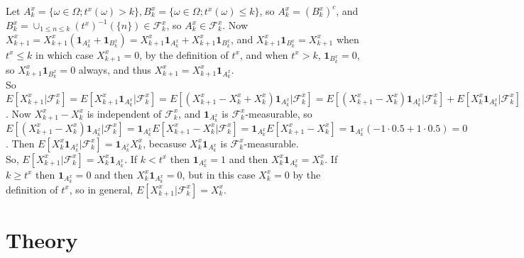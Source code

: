 \documentclass[12pt]{article}
\newcommand{\fall}[0] { \textrm{ for all } }
\newcommand{\nats}[0] { \mathbb{N}}
\newcommand{\F}[0] { \mathcal{F} }
\newcommand{\om}[0] { \omega }
\newcommand{\Om}[0] { \Omega }
\newcommand{ \cf }[1] { \mathbf{1}_{#1} }
\begin{document}
\noindent
Let $A^x_k = \{ \om \in \Om; t^x(\om) > k \} , B^x_k = \{ \om \in \Om; t^x(\om) \le k \} $, so $A^x_k = (B^x_k)^c$, and $B^x_k = \cup_{1 \le n \le k} (t^x)^{-1}(\{ n\}) \in \F^x_k$, so $A^x_k \in \F^x_k$. Now $X^x_{k+1} = X^x_{k+1} ( \cf{A^x_k} + \cf{B^x_k} ) = X^x_{k+1}  \cf{A^x_k} + X^x_{k+1} \cf{B^x_k} $, and $ X^x_{k+1} \cf{B^x_k} = X^x_{k+1} $ when $t^x \le k$ in which case $X^x_{k+1} = 0$, by the definition of $t^x$, and when $t^x > k$,  $ \cf{B^x_k} = 0$, so  $ X^x_{k+1} \cf{B^x_k} = 0 $ always, and thus $X^x_{k+1} = X^x_{k+1} \cf{A^x_k}$. \\

\noindent
So $E[ X^x_{k+1} | \F^x_k ] = E[ X^x_{k+1}\cf{A^x_k}  | \F^x_k ] = E[ ( X^x_{k+1} - X^x_{k}  + X^x_{k}   ) \cf{A^x_k}  | \F^x_k ] = E[ ( X^x_{k+1} - X^x_{k} ) \cf{A^x_k}  | \F^x_k ]  + E[  X^x_{k}   \cf{A^x_k}  | \F^x_k ]    $. Now $X^x_{k+1} - X^x_{k}$ is independent of $ \F^x_k $, and $\cf{A^x_k}$ is $\F^x_k$-measurable, so 
$ E[ ( X^x_{k+1} - X^x_{k} ) \cf{A^x_k}  | \F^x_k ]  = \cf{A^x_k} E[ X^x_{k+1} - X^x_{k}  | \F^x_k ] =  \cf{A^x_k} E[ X^x_{k+1} - X^x_{k} ] = \cf{A^x_k} \left( -1 \cdot 0.5 + 1 \cdot 0.5 \right) = 0$. Then $E[  X^x_{k}   \cf{A^x_k}  | \F^x_k ] =  \cf{A^x_k} X^x_{k} $, becasuse $X^x_{k}   \cf{A^x_k} $ is $\F^x_k$-measurable.   \\

\noindent
So, $E[ X^x_{k+1} | \F^x_k ] =X^x_{k} \cf{A^x_k} $. If $k < t^x$ then $ \cf{A^x_k} = 1$ and then $X^x_{k} \cf{A^x_k} = X^x_{k} $. If $k \ge t^x$ then $ \cf{A^x_k} = 0$ and then $X^x_{k} \cf{A^x_k} = 0 $, but in this case $X^x_k = 0$ by the definition of $t^x$, so  in general, $E[ X^x_{k+1} | \F^x_k ] =X^x_{k} $.










\section*{Theory}
\end{document}
